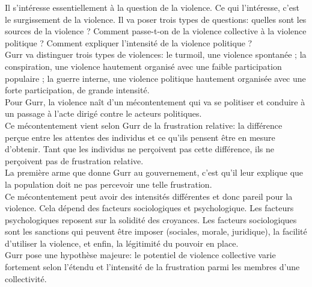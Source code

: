\documentclass[10pt, a4paper, openany]{book}
\begin{document}
Il s'intéresse essentiellement à la question de la violence. Ce qui l'intéresse, c'est le surgissement de la violence. Il va poser trois types de questions: quelles sont les sources de la violence ? Comment passe-t-on de la violence collective à la violence politique ? Comment expliquer l'intensité de la violence politique ? \\
Gurr va distinguer trois types de violences: le turmoil, une violence spontanée ; la conspiration, une violence hautement organisé avec une faible participation populaire ; la guerre interne, une violence politique hautement organisée avec une forte participation, de grande intensité. \\
Pour Gurr, la violence naît d'un mécontentement qui va se politiser et conduire à un passage à l'acte dirigé contre le acteurs politiques. \\
Ce mécontentement vient selon Gurr de la frustration relative: la différence perçue entre les attentes des individus et ce qu'ils pensent être en mesure d'obtenir. Tant que les individus ne perçoivent pas cette différence, ils ne perçoivent pas de frustration relative. \\
La première arme que donne Gurr au gouvernement, c'est qu'il leur explique que la population doit ne pas percevoir une telle frustration. \\
Ce mécontentement peut avoir des intensités différentes et donc pareil pour la violence. Cela dépend des facteurs sociologiques et psychologique. Les facteurs psychologiques reposent sur la solidité des croyances. Les facteurs sociologiques sont les sanctions qui peuvent être imposer (sociales, morale, juridique), la facilité d'utiliser la violence, et enfin, la légitimité du pouvoir en place. \\
Gurr pose une hypothèse majeure: le potentiel de violence collective varie fortement selon l'étendu et l'intensité de la frustration parmi les membres d'une collectivité.
\end{document}
